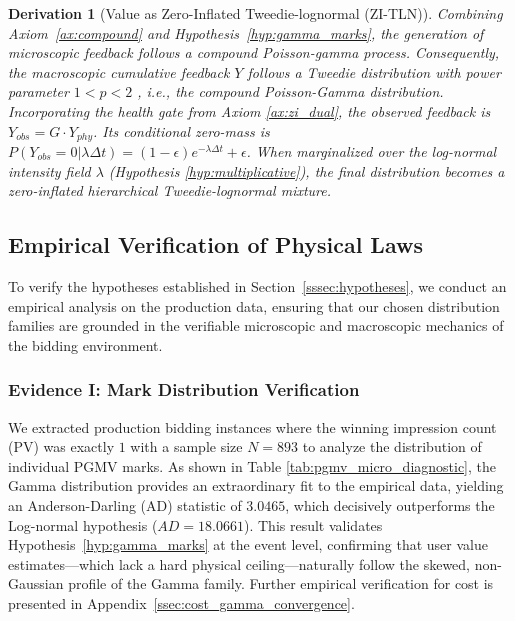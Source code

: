 \documentclass[sigconf, anonymous, review]{acmart}
\newtheorem{derivation}{Derivation}
\begin{document}
\begin{derivation}[Value as Zero-Inflated Tweedie-lognormal (ZI-TLN)]
Combining Axiom~\ref{ax:compound} and Hypothesis~\ref{hyp:gamma_marks}, the generation of microscopic feedback follows a compound Poisson-gamma process.
Consequently, the macroscopic cumulative feedback $Y$ follows a Tweedie distribution with power parameter $1 < p < 2$ \cite{tweedie1984index}, i.e., the compound Poisson-Gamma distribution.
Incorporating the health gate from Axiom \ref{ax:zi_dual}, the observed feedback is $Y_{obs} = G \cdot Y_{phy}$. Its conditional zero-mass is $P(Y_{obs}=0|\lambda\Delta t) = (1-\epsilon)e^{-\lambda\Delta t} + \epsilon$.
When marginalized over the log-normal intensity field $\lambda$ (Hypothesis \ref{hyp:multiplicative}), the final distribution becomes a zero-inflated hierarchical Tweedie-lognormal mixture.
\end{derivation}



\subsection{Empirical Verification of Physical Laws}
\label{ssec:hypothsis_testing}

To verify the hypotheses established in Section~\ref{sssec:hypotheses}, we conduct an empirical analysis on the production data, ensuring that our chosen distribution families are grounded in the verifiable microscopic and macroscopic mechanics of the bidding environment.

\subsubsection{Evidence I: Mark Distribution Verification}
We extracted production bidding instances where the winning impression count (PV) was exactly $1$ with a sample size $N=893$ to analyze the distribution of individual PGMV marks. 
As shown in Table \ref{tab:pgmv_micro_diagnostic}, the Gamma distribution provides an extraordinary fit to the empirical data, yielding an Anderson-Darling (AD) statistic of $3.0465$, which decisively outperforms the Log-normal hypothesis ($AD=18.0661$). This result validates Hypothesis~\ref{hyp:gamma_marks} at the event level, confirming that user value estimates—which lack a hard physical ceiling—naturally follow the skewed, non-Gaussian profile of the Gamma family. Further empirical verification for cost is presented in Appendix~\ref{ssec:cost_gamma_convergence}.
\end{document}
